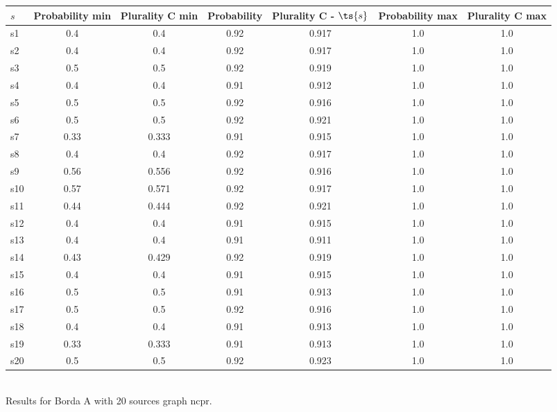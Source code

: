 \documentclass{article}
\begin{document}
\noindent\begin{tabular}{|l|c|c|c|c|c|c|}
\hline
$s$& Probability min & Plurality C min & Probability & Plurality C - $\ts{s}$ & Probability max & Plurality C max\\
\hline
s1 &0.4 & 0.4 & 0.92 & 0.917 & 1.0 & 1.0\\
\hline
s2 &0.4 & 0.4 & 0.92 & 0.917 & 1.0 & 1.0\\
\hline
s3 &0.5 & 0.5 & 0.92 & 0.919 & 1.0 & 1.0\\
\hline
s4 &0.4 & 0.4 & 0.91 & 0.912 & 1.0 & 1.0\\
\hline
s5 &0.5 & 0.5 & 0.92 & 0.916 & 1.0 & 1.0\\
\hline
s6 &0.5 & 0.5 & 0.92 & 0.921 & 1.0 & 1.0\\
\hline
s7 &0.33 & 0.333 & 0.91 & 0.915 & 1.0 & 1.0\\
\hline
s8 &0.4 & 0.4 & 0.92 & 0.917 & 1.0 & 1.0\\
\hline
s9 &0.56 & 0.556 & 0.92 & 0.916 & 1.0 & 1.0\\
\hline
s10 &0.57 & 0.571 & 0.92 & 0.917 & 1.0 & 1.0\\
\hline
s11 &0.44 & 0.444 & 0.92 & 0.921 & 1.0 & 1.0\\
\hline
s12 &0.4 & 0.4 & 0.91 & 0.915 & 1.0 & 1.0\\
\hline
s13 &0.4 & 0.4 & 0.91 & 0.911 & 1.0 & 1.0\\
\hline
s14 &0.43 & 0.429 & 0.92 & 0.919 & 1.0 & 1.0\\
\hline
s15 &0.4 & 0.4 & 0.91 & 0.915 & 1.0 & 1.0\\
\hline
s16 &0.5 & 0.5 & 0.91 & 0.913 & 1.0 & 1.0\\
\hline
s17 &0.5 & 0.5 & 0.92 & 0.916 & 1.0 & 1.0\\
\hline
s18 &0.4 & 0.4 & 0.91 & 0.913 & 1.0 & 1.0\\
\hline
s19 &0.33 & 0.333 & 0.91 & 0.913 & 1.0 & 1.0\\
\hline
s20 &0.5 & 0.5 & 0.92 & 0.923 & 1.0 & 1.0\\
\hline
\end{tabular}\\

\noindent Results for Borda A with 20 sources graph ncpr.
\end{document}
